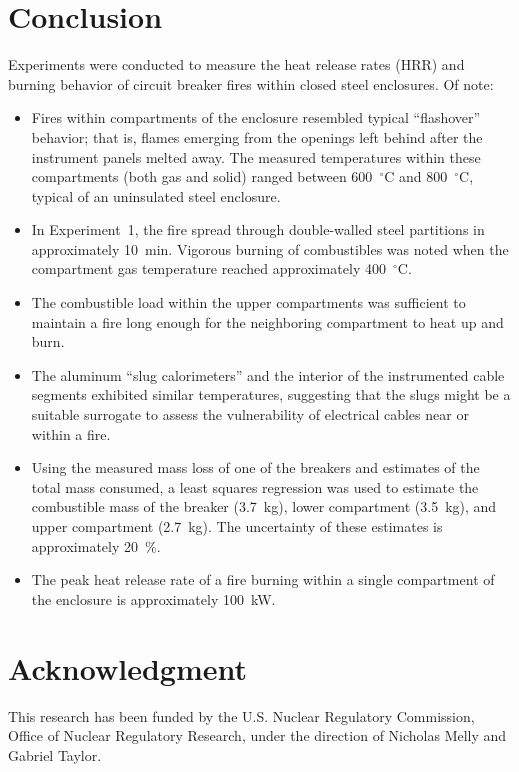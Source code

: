 \documentclass[12pt]{article}
\begin{document}
\clearpage

\section{Conclusion}

Experiments were conducted to measure the heat release rates (HRR) and burning behavior of circuit breaker fires within closed steel enclosures. Of note:
\begin{itemize}
\item Fires within compartments of the enclosure resembled typical  ``flashover'' behavior; that is, flames emerging from the openings left behind after the instrument panels melted away. The measured temperatures within these compartments (both gas and solid) ranged between 600~$^\circ$C and 800~$^\circ$C, typical of an uninsulated steel enclosure.
\item In Experiment~1, the fire spread through double-walled steel partitions in approximately 10~min. Vigorous burning of combustibles was noted when the compartment gas temperature reached approximately 400~$^\circ$C.
\item The combustible load within the upper compartments was sufficient to maintain a fire long enough for the neighboring compartment to heat up and burn.
\item The aluminum ``slug calorimeters'' and the interior of the instrumented cable segments exhibited similar temperatures, suggesting that the slugs might be a suitable surrogate to assess the vulnerability of electrical cables near or within a fire.
\item Using the measured mass loss of one of the breakers and estimates of the total mass consumed, a least squares regression was used to estimate the combustible mass of the breaker (3.7~kg), lower compartment (3.5~kg), and upper compartment (2.7~kg). The uncertainty of these estimates is approximately 20~\%.
\item The peak heat release rate of a fire burning within a single compartment of the enclosure is approximately 100~kW.
\end{itemize}



\section{Acknowledgment}

This research has been funded by the U.S. Nuclear Regulatory Commission, Office of Nuclear Regulatory Research, under the direction of Nicholas Melly and Gabriel Taylor.
\end{document}
